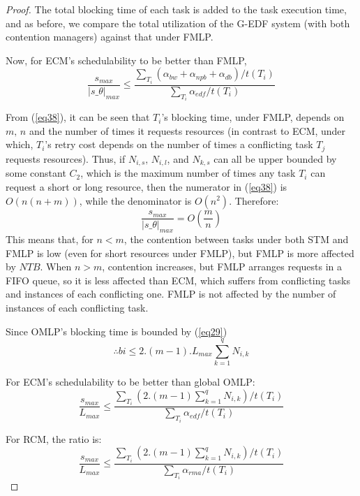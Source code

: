 \documentclass[a4paper,english]{article}
\newtheorem{proof}{Proof}
\begin{document}
\begin{proof}
The total blocking time of each task is added to the task execution time, and
as before, we compare the total utilization of the G-EDF system (with both contention managers) against that under FMLP. 

Now, for ECM's schedulability to be better than FMLP,
\begin{equation}
 \frac{s_{max}}{|s\_\theta|_{max}}\le
 \frac{\sum_{T_{i}}\left(\alpha_{bw}+\alpha_{npb}+\alpha_{db}\right) \Big/t(T_{i})}{\sum_{T_{i}}\alpha_{edf} \Big/t(T_{i})}
 \label{eq38} \end{equation}

From (\ref{eq38}), it can be seen that $T_{i}$'s blocking time,
under FMLP, depends on $m,\, n$ and the number of times it requests resources
(in contrast to ECM, 
under which, $T_i$'s retry cost depends on the number of times a conflicting task $T_{j}$ requests resources). Thus, if $N_{i,s},\, N_{i,l}$, 
and $N_{k,s}$ can all be upper bounded by some constant $C_{2}$,
which is the maximum number of times any task $T_{i}$ can request a short
or long resource, then the numerator in (\ref{eq38}) 
is $O(n(n+m))$, while the denominator is $O(n^{2})$. Therefore:
\begin{equation}
\frac{s_{max}}{|s\_\theta|_{max}}=O\left(\frac{m}{n} \right)
\label{eq45}
\end{equation}
This means that, for $n<m$, the contention between tasks under both STM and
FMLP is low (even for short resources under FMLP), but FMLP is more affected
by $NTB$. When $n>m$, contention increases, but FMLP arranges
requests in a FIFO queue, so it is less affected than ECM, 
which
suffers from conflicting tasks and instances
of each conflicting one. FMLP is not affected by the number of instances
of each conflicting task.

Since OMLP's blocking time is bounded by (\ref{eq29}) \[ \therefore 
bi\le2.\left(m-1\right).L_{max}\sum_{k=1}^{q}N_{i,k}\]


For ECM's schedulability to be better than global OMLP:
\begin{equation}
\frac{s_{max}}{L_{max}}\le\frac{\sum_{T_{i}}\left(2.\left(m-1\right)\sum_{k=1}^{q}N_{i,k}\right) \Big/t\left(T_{i}\right)}{\sum_{T_{i}}\alpha_{edf} \Big/t\left(T_{i}\right)}\label{eq40}\end{equation}

For RCM, the ratio is:
\begin{equation}
\frac{s_{max}}{L_{max}}\le\frac{\sum_{T_{i}}\left(2.\left(m-1\right)\sum_{k=1}^{q}N_{i,k}\right) \Big/t\left(T_{i}\right)}{\sum_{T_{i}}\alpha_{rma} \big/t\left(T_{i}\right)}\label{eq41}\end{equation}



\end{proof}
\end{document}
